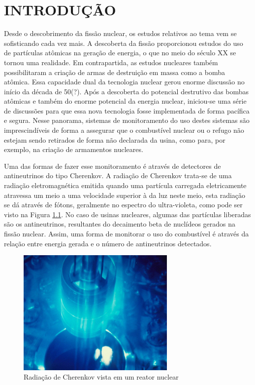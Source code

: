 \chapter{INTRODUÇÃO} \label{cap:intro}
\vspace{-2cm}

Desde o descobrimento da fissão nuclear, os estudos relativos ao tema vem se sofisticando cada vez mais. A descoberta da fissão proporcionou estudos do uso de partículas atômicas na geração de energia, o que no meio do século XX se tornou uma realidade. Em contrapartida, as estudos nucleares também possibilitaram a criação de armas de destruição em massa como a bomba atômica. Essa capacidade dual da tecnologia nuclear gerou enorme discussão no início da década de 50(?). Após a descoberta do potencial destrutivo das bombas atômicas e também do enorme potencial da energia nuclear, iniciou-se uma série de discussões para que essa nova tecnologia fosse implementada de forma pacífica e segura.
Nesse panorama, sistemas de monitoramento do uso destes sistemas são imprescindíveis de forma a assegurar que o combustível nuclear ou o refugo não estejam sendo retirados de forma não declarada da usina, como para, por exemplo, na criação de armamentos nucleares.

Uma das formas de fazer esse monitoramento é através de detectores de antineutrinos do tipo Cherenkov. A radiação de Cherenkov trata-se de uma radiação eletromagnética emitida quando uma partícula carregada eletricamente atravessa um meio a uma velocidade superior à da luz neste meio, esta radiação se dá através de fótons, geralmente no espectro do ultra-violeta, como pode ser visto na Figura \ref{fig:cherenkov}. No caso de usinas nucleares, algumas das partículas liberadas são os antineutrinos, resultantes do decaimento beta de nuclídeos gerados na fissão nuclear. Assim, uma forma de monitorar o uso do combustível é através da relação entre energia gerada e o número de antineutrinos detectados. 

\begin{figure}[H]
	\centering
		\includegraphics[width=7.7cm]{textuais/simulacao/figuras/cherenkov.jpg}
		\caption{Radiação de Cherenkov vista em um reator nuclear}
		\label{fig:cherenkov}
\end{figure}%

